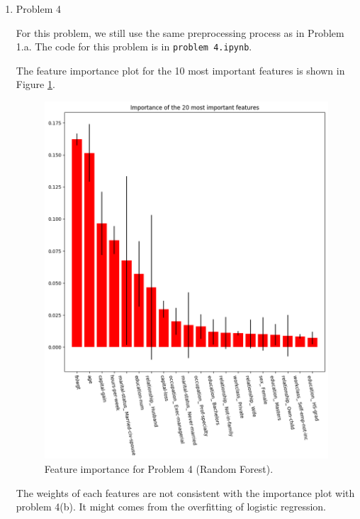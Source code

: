 \documentclass{article}%
\begin{document}
\begin{enumerate}
\item Problem 4

For this problem, we still use the same preprocessing process as in Problem 1.a. The code for this problem is in \texttt{problem 4.ipynb}.

The feature importance plot for the 10 most important features is shown in Figure \ref{problem4-importance}.

\begin{figure}[htbp]
\centering
\includegraphics[scale=0.4]{problem4_importance.png}
\caption{Feature importance for Problem 4 (Random Forest).}
\label{problem4-importance}
\end{figure}

The weights of each features are not consistent with the importance plot with problem 4(b). It might comes from the overfitting of logistic regression.


\end{enumerate}
\end{document}
